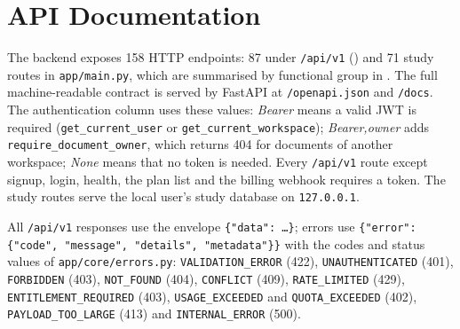 \section{API Documentation}\label{sec:api}

The backend exposes 158 HTTP endpoints: 87 under \texttt{/api/v1} ()
and 71 study routes in \texttt{app/main.py}, which are summarised by functional group in
. The full machine-readable contract is served by FastAPI at
\texttt{/openapi.json} and \texttt{/docs}. The authentication column uses these values:
\emph{Bearer} means a valid JWT is required (\texttt{get\_current\_user} or
\texttt{get\_current\_workspace}); \emph{Bearer,\newline owner} adds
\texttt{require\_document\_owner}, which returns 404 for documents of another workspace;
\emph{None} means that no token is needed. Every \texttt{/api/v1} route except signup,
login, health, the plan list and the billing webhook requires a token. The study routes
serve the local user's study database on \texttt{127.0.0.1}.

All \texttt{/api/v1} responses use the envelope \texttt{\{"data": \ldots\}}; errors use
\texttt{\{"error": \{"code", "message", "details", "metadata"\}\}} with the codes and
status values of \texttt{app/core/errors.py}: \texttt{VALIDATION\_ERROR} (422),
\texttt{UNAUTHENTICATED} (401), \texttt{FORBIDDEN} (403), \texttt{NOT\_FOUND} (404),
\texttt{CONFLICT} (409), \texttt{RATE\_LIMITED} (429), \texttt{ENTITLEMENT\_REQUIRED}
(403), \texttt{USAGE\_EXCEEDED} and \texttt{QUOTA\_EXCEEDED} (402),
\texttt{PAYLOAD\_TOO\_LARGE} (413) and \texttt{INTERNAL\_ERROR} (500).

